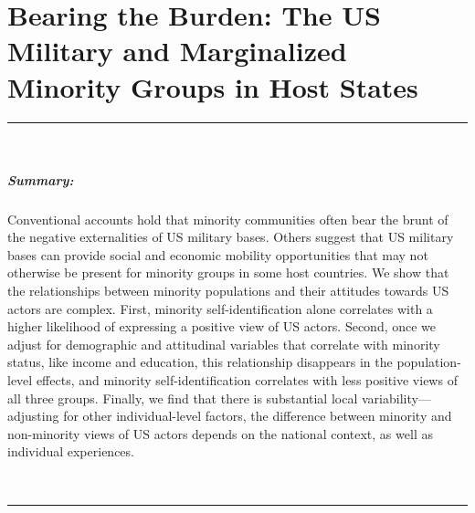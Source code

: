 \chapter{Bearing the Burden: The US Military and Marginalized Minority Groups in Host States \label{cha:min}}


\doublespacing



\vspace*{-0.85cm}
\rule{\linewidth}{0.10pt} \\[-1.25cm]
{\footnotesize\paragraph{Summary:} Conventional accounts hold that minority communities often bear the brunt of the negative externalities of US military bases. Others suggest that US military bases can provide social and economic mobility opportunities that may not otherwise be present for minority groups in some host countries. We show that the relationships between minority populations and their attitudes towards US actors are complex. First, minority self-identification alone correlates with a higher likelihood of expressing a positive view of US actors. Second, once we adjust for demographic and attitudinal variables that correlate with minority status, like income and education, this relationship disappears in the population-level effects, and minority self-identification correlates with less positive views of all three groups. Finally, we find that there is substantial local variability---adjusting for other individual-level factors, the difference between minority and non-minority views of US actors depends on the national context, as well as individual experiences.} 
\\[-0.5cm] 
\rule{\linewidth}{0.10pt}

\vspace*{0.5cm}



